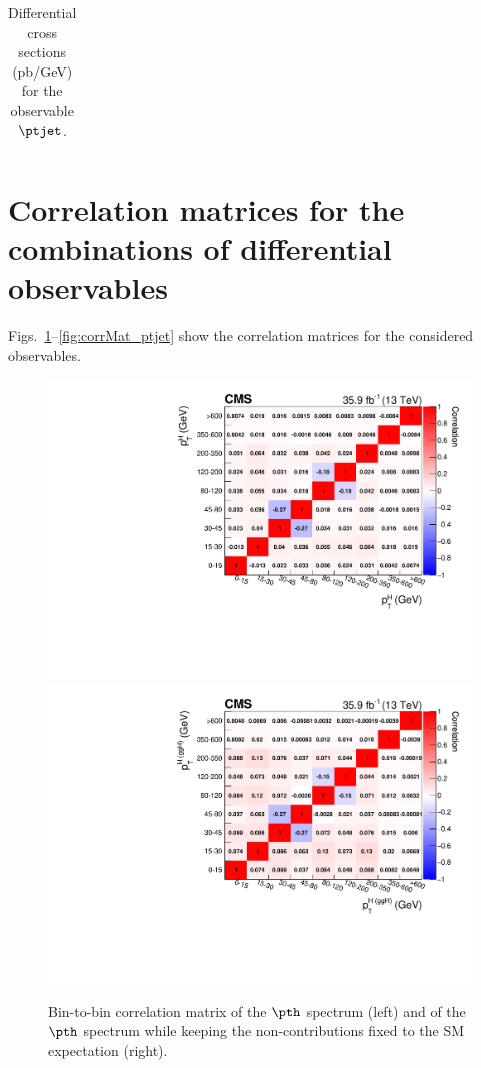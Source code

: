 \begin{table}[h!]
    \caption{
        Differential cross sections (pb/GeV) for the observable $\ptjet$.
        }
    \label{tab:numbers_ptjet}
    \scriptsize
    \begin{center}
    \begin{tabular}{|l|c|c|c|c|c|}
    \hline
     \\
    \hline
    \end{tabular}
    \end{center}
    \end{table}


\clearpage
\section{Correlation matrices for the combinations of differential observables}
\label{sec:binToBinCorrelationMatrices}

Figs.~\ref{fig:corrMat_pth}--\ref{fig:corrMat_ptjet} show the correlation matrices for the considered observables.

\begin{figure}[hbtp]
  \begin{center}
    \includegraphics[width=0.49\linewidth]{img/differentials/appendix/corrmat_pth_smH.pdf}
    \includegraphics[width=0.49\linewidth]{img/differentials/appendix/corrmat_pth_ggH.pdf}
    \caption{
         Bin-to-bin correlation matrix of the $\pth$ spectrum (left) and of the $\pth$ spectrum while keeping the non-\ggh contributions fixed to the SM expectation (right).
        }
    \label{fig:corrMat_pth}
  \end{center}
\end{figure}

